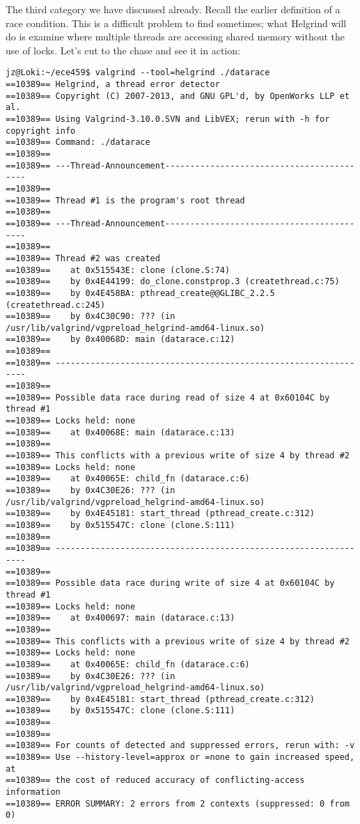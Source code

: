 The third category we have discussed already. Recall the earlier definition of a race condition. This is a difficult problem to find sometimes; what Helgrind will do is examine where multiple threads are accessing shared memory without the use of locks. Let's cut to the chase and see it in action:


\begin{lstlisting}
jz@Loki:~/ece459$ valgrind --tool=helgrind ./datarace
==10389== Helgrind, a thread error detector
==10389== Copyright (C) 2007-2013, and GNU GPL'd, by OpenWorks LLP et al.
==10389== Using Valgrind-3.10.0.SVN and LibVEX; rerun with -h for copyright info
==10389== Command: ./datarace
==10389== 
==10389== ---Thread-Announcement------------------------------------------
==10389== 
==10389== Thread #1 is the program's root thread
==10389== 
==10389== ---Thread-Announcement------------------------------------------
==10389== 
==10389== Thread #2 was created
==10389==    at 0x515543E: clone (clone.S:74)
==10389==    by 0x4E44199: do_clone.constprop.3 (createthread.c:75)
==10389==    by 0x4E458BA: pthread_create@@GLIBC_2.2.5 (createthread.c:245)
==10389==    by 0x4C30C90: ??? (in /usr/lib/valgrind/vgpreload_helgrind-amd64-linux.so)
==10389==    by 0x40068D: main (datarace.c:12)
==10389== 
==10389== ----------------------------------------------------------------
==10389== 
==10389== Possible data race during read of size 4 at 0x60104C by thread #1
==10389== Locks held: none
==10389==    at 0x40068E: main (datarace.c:13)
==10389== 
==10389== This conflicts with a previous write of size 4 by thread #2
==10389== Locks held: none
==10389==    at 0x40065E: child_fn (datarace.c:6)
==10389==    by 0x4C30E26: ??? (in /usr/lib/valgrind/vgpreload_helgrind-amd64-linux.so)
==10389==    by 0x4E45181: start_thread (pthread_create.c:312)
==10389==    by 0x515547C: clone (clone.S:111)
==10389== 
==10389== ----------------------------------------------------------------
==10389== 
==10389== Possible data race during write of size 4 at 0x60104C by thread #1
==10389== Locks held: none
==10389==    at 0x400697: main (datarace.c:13)
==10389== 
==10389== This conflicts with a previous write of size 4 by thread #2
==10389== Locks held: none
==10389==    at 0x40065E: child_fn (datarace.c:6)
==10389==    by 0x4C30E26: ??? (in /usr/lib/valgrind/vgpreload_helgrind-amd64-linux.so)
==10389==    by 0x4E45181: start_thread (pthread_create.c:312)
==10389==    by 0x515547C: clone (clone.S:111)
==10389== 
==10389== 
==10389== For counts of detected and suppressed errors, rerun with: -v
==10389== Use --history-level=approx or =none to gain increased speed, at
==10389== the cost of reduced accuracy of conflicting-access information
==10389== ERROR SUMMARY: 2 errors from 2 contexts (suppressed: 0 from 0)
\end{lstlisting}

